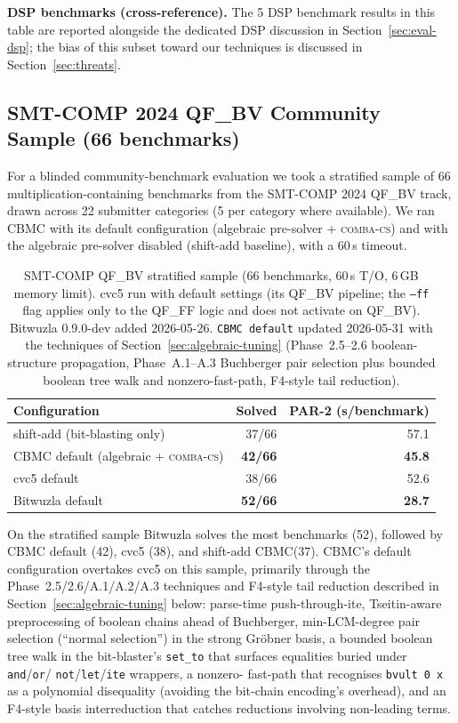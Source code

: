 \documentclass[runningheads]{llncs}
\newcommand{\combacs}{\textsc{comba-cs}\xspace}
\newcommand{\cbmc}{\textsc{CBMC}\xspace}
\begin{document}
\textbf{DSP benchmarks (cross-reference).} The 5 DSP benchmark
results in this table are reported alongside the dedicated DSP
discussion in Section~\ref{sec:eval-dsp}; the bias of this
subset toward our techniques is discussed in
Section~\ref{sec:threats}.

\subsection{SMT-COMP 2024 QF\_BV Community Sample (66 benchmarks)}
\label{sec:eval-smtcomp}

For a blinded community-benchmark evaluation we took a stratified
sample of 66 multiplication-containing benchmarks from the SMT-COMP
2024 QF\_BV track, drawn across 22 submitter categories (5 per
category where available). We ran \cbmc with its default
configuration (algebraic pre-solver + \combacs) and with the
algebraic pre-solver disabled (shift-add baseline), with a 60\,s
timeout.

\begin{table}[ht]
\caption{SMT-COMP QF\_BV stratified sample (66 benchmarks, 60\,s T/O,
6\,GB memory limit).
  cvc5 run with default settings (its QF\_BV pipeline; the \texttt{--ff}
  flag applies only to the QF\_FF logic and does not activate on
  QF\_BV). Bitwuzla 0.9.0-dev added 2026-05-26.
  \texttt{\cbmc default} updated 2026-05-31 with the techniques of
  Section~\ref{sec:algebraic-tuning} (Phase~2.5--2.6 boolean-structure
  propagation, Phase~A.1--A.3 Buchberger pair selection plus
  bounded boolean tree walk and nonzero-fast-path, F4-style tail
  reduction).}
\label{tab:smtcomp-sample}
\centering
\begin{tabular}{lrr}
\toprule
Configuration & Solved & PAR-2 (s/benchmark) \\
\midrule
shift-add (bit-blasting only) & 37/66 & 57.1 \\
\cbmc default (algebraic + \combacs) & \textbf{42/66} & \textbf{45.8} \\
cvc5 default & 38/66 & 52.6 \\
Bitwuzla default & \textbf{52/66} & \textbf{28.7} \\
\bottomrule
\end{tabular}
\end{table}

On the stratified sample Bitwuzla solves the most benchmarks
(52), followed by \cbmc default (42), cvc5 (38), and shift-add
\cbmc (37). \cbmc's default configuration overtakes cvc5 on
this sample, primarily through the Phase~2.5/2.6/A.1/A.2/A.3
techniques and F4-style tail reduction described in
Section~\ref{sec:algebraic-tuning} below: parse-time
push-through-ite, Tseitin-aware preprocessing of boolean chains
ahead of Buchberger, min-LCM-degree pair selection
(``normal selection'') in the strong Gr\"obner basis, a
bounded boolean tree walk in the bit-blaster's \texttt{set\_to}
that surfaces equalities buried under \texttt{and}/\texttt{or}/
\texttt{not}/\texttt{let}/\texttt{ite} wrappers, a nonzero-
fast-path that recognises \texttt{bvult 0 x} as a polynomial
disequality (avoiding the bit-chain encoding's overhead), and an
F4-style basis interreduction that catches reductions involving
non-leading terms.
\end{document}
